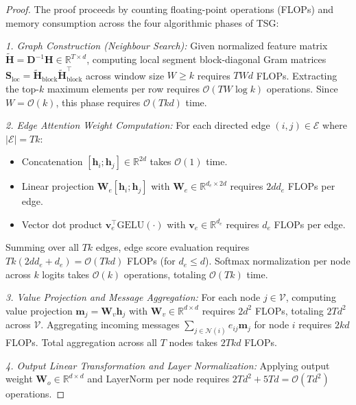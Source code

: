 \documentclass[letterpaper]{article}
\begin{document}
\begin{proof}
The proof proceeds by counting floating-point operations (FLOPs) and memory consumption across the four algorithmic phases of TSG:

\textit{1. Graph Construction (Neighbour Search):} 
Given normalized feature matrix $\tilde{\mathbf{H}} = \mathbf{D}^{-1} \mathbf{H} \in \mathbb{R}^{T \times d}$, computing local segment block-diagonal Gram matrices $\mathbf{S}_{\text{loc}} = \tilde{\mathbf{H}}_{\text{block}} \tilde{\mathbf{H}}_{\text{block}}^\top$ across window size $W \ge k$ requires $T W d$ FLOPs. Extracting the top-$k$ maximum elements per row requires $\mathcal{O}(T W \log k)$ operations. Since $W = \mathcal{O}(k)$, this phase requires $\mathcal{O}(T k d)$ time.

\textit{2. Edge Attention Weight Computation:} 
For each directed edge $(i, j) \in \mathcal{E}$ where $|\mathcal{E}| = T k$:
\begin{itemize}
    \item Concatenation $[\mathbf{h}_i ; \mathbf{h}_j] \in \mathbb{R}^{2d}$ takes $\mathcal{O}(1)$ time.
    \item Linear projection $\mathbf{W}_e [\mathbf{h}_i ; \mathbf{h}_j]$ with $\mathbf{W}_e \in \mathbb{R}^{d_e \times 2d}$ requires $2 d d_e$ FLOPs per edge.
    \item Vector dot product $\mathbf{v}_e^\top \text{GELU}(\cdot)$ with $\mathbf{v}_e \in \mathbb{R}^{d_e}$ requires $d_e$ FLOPs per edge.
\end{itemize}
Summing over all $T k$ edges, edge score evaluation requires $T k (2 d d_e + d_e) = \mathcal{O}(T k d)$ FLOPs (for $d_e \le d$). Softmax normalization per node across $k$ logits takes $\mathcal{O}(k)$ operations, totaling $\mathcal{O}(T k)$ time.

\textit{3. Value Projection and Message Aggregation:} 
For each node $j \in \mathcal{V}$, computing value projection $\mathbf{m}_j = \mathbf{W}_v \mathbf{h}_j$ with $\mathbf{W}_v \in \mathbb{R}^{d \times d}$ requires $2 d^2$ FLOPs, totaling $2 T d^2$ across $\mathcal{V}$. Aggregating incoming messages $\sum_{j \in \mathcal{N}(i)} e_{ij} \mathbf{m}_j$ for node $i$ requires $2 k d$ FLOPs. Total aggregation across all $T$ nodes takes $2 T k d$ FLOPs.

\textit{4. Output Linear Transformation and Layer Normalization:} 
Applying output weight $\mathbf{W}_o \in \mathbb{R}^{d \times d}$ and LayerNorm per node requires $2 T d^2 + 5 T d = \mathcal{O}(T d^2)$ operations.


\end{proof}
\end{document}
